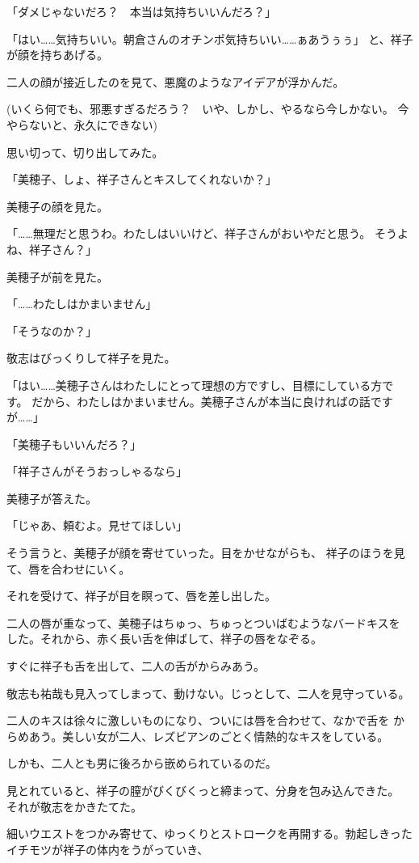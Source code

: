 ﻿\documentclass[
    book,tate,
    line_length=30zw,
    jafontsize=12pt,
    paper=b5j,
    landscape,
    ]{jlreq}
\begin{document}
「ダメじゃないだろ？　本当は気持ちいいんだろ？」

「はい……気持ちいい。朝倉さんのオチンポ気持ちいい……ぁあうぅぅ」
と、祥子が顔を持ちあげる。

二人の顔が接近したのを見て、悪魔のようなアイデアが浮かんだ。

(いくら何でも、邪悪すぎるだろう？　いや、しかし、やるなら今しかない。
今やらないと、永久にできない)

思い切って、切り出してみた。

「美穂子、しょ、祥子さんとキスしてくれないか？」

美穂子の顔を見た。

「……無理だと思うわ。わたしはいいけど、祥子さんがおいやだと思う。
そうよね、祥子さん？」

美穂子が前を見た。

「……わたしはかまいません」

「そうなのか？」

敬志はびっくりして祥子を見た。

「はい……美穂子さんはわたしにとって理想の方ですし、目標にしている方です。
だから、わたしはかまいません。美穂子さんが本当に良ければの話ですが……」

「美穂子もいいんだろ？」

「祥子さんがそうおっしゃるなら」

美穂子が答えた。

「じゃあ、頼むよ。見せてほしい」

そう言うと、美穂子が顔を寄せていった。目をかせながらも、
祥子のほうを見て、唇を合わせにいく。

それを受けて、祥子が目を瞑って、唇を差し出した。

二人の唇が重なって、美穂子はちゅっ、ちゅっとついばむようなバードキスを
した。それから、赤く長い舌を伸ばして、祥子の唇をなぞる。

すぐに祥子も舌を出して、二人の舌がからみあう。

敬志も祐哉も見入ってしまって、動けない。じっとして、二人を見守っている。

二人のキスは徐々に激しいものになり、ついには唇を合わせて、なかで舌を
からめあう。美しい女が二人、レズビアンのごとく情熱的なキスをしている。

しかも、二人とも男に後ろから嵌められているのだ。

見とれていると、祥子の膣がびくびくっと締まって、分身を包み込んできた。
それが敬志をかきたてた。

細いウエストをつかみ寄せて、ゆっくりとストロークを再開する。勃起しきった
イチモツが祥子の体内をうがっていき、
\end{document}
